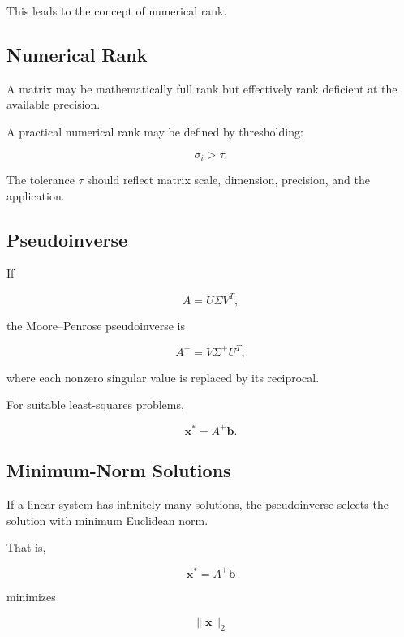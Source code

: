 This leads to the concept of numerical rank.

\subsection{Numerical Rank}
\label{subsec:numerical-rank}

A matrix may be mathematically full rank but effectively rank deficient at
the available precision.

A practical numerical rank may be defined by thresholding:

\[
\boxed{
\sigma_i
>
\tau.
}
\]

The tolerance \(\tau\) should reflect matrix scale, dimension, precision,
and the application.

\subsection{Pseudoinverse}
\label{subsec:moore-penrose-pseudoinverse}

If

\[
A
=
U\Sigma V^T,
\]

the Moore--Penrose pseudoinverse is

\[
\boxed{
A^+
=
V\Sigma^+U^T,
}
\]

where each nonzero singular value is replaced by its reciprocal.

For suitable least-squares problems,

\[
\boxed{
\mathbf{x}^*
=
A^+\mathbf{b}.
}
\]

\subsection{Minimum-Norm Solutions}
\label{subsec:minimum-norm-solutions}

If a linear system has infinitely many solutions, the pseudoinverse selects
the solution with minimum Euclidean norm.

That is,

\[
\boxed{
\mathbf{x}^*
=
A^+\mathbf{b}
}
\]

minimizes

\[
\|\mathbf{x}\|_2
\]

